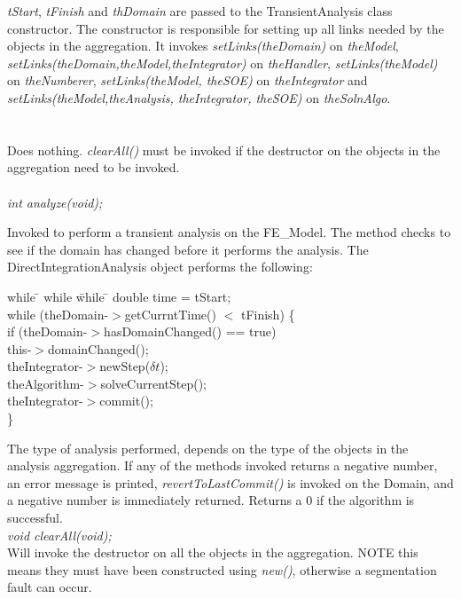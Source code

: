 {\em tStart}, {\em tFinish} and {\em thDomain} are passed to the
TransientAnalysis class constructor. The constructor is responsible
for setting up all links needed by the objects in the aggregation. It
invokes {\em setLinks(theDomain)} on {\em theModel}, {\em
setLinks(theDomain,theModel,theIntegrator)} on {\em theHandler}, 
{\em setLinks(theModel)} on {\em theNumberer},  {\em
setLinks(theModel, theSOE)} on {\em theIntegrator} and  {\em
setLinks(theModel,theAnalysis, theIntegrator, theSOE)} on {\em
theSolnAlgo}. \\

 \\
\\ 
Does nothing. {\em clearAll()} must be invoked if the destructor on
the objects in the aggregation need to be invoked. \\

\\
{\em int analyze(void);} 

Invoked to perform a transient analysis on the FE\_Model. The method
checks to see if the domain has changed before it performs the
analysis. The DirectIntegrationAnalysis object performs the following:
\begin{tabbing}
while \= \+ while \= while \= \kill
    double time = tStart; \\
    while (theDomain-$>$getCurrntTime() $<$ tFinish) \{ \+ \\
       if (theDomain-$>$hasDomainChanged() == true) \+\\
           this-$>$domainChanged(); \- \\

	theIntegrator-$>$newStep($\delta t$); \\
	theAlgorithm-$>$solveCurrentStep(); \\
        theIntegrator-$>$commit(); \- \\
    \}
\end{tabbing}
\noindent The type of analysis performed, depends on the type of the
objects in the analysis aggregation. If any of the methods invoked
returns a negative number, an error message is printed, {\em
revertToLastCommit()} is invoked on the Domain, and a negative number
is immediately returned. Returns a $0$ if the algorithm is successful. \\

{\em void clearAll(void);} \\
Will invoke the destructor on all the objects in the aggregation. NOTE
this means they must have been constructed using {\em new()},
otherwise a segmentation fault can occur.\\

